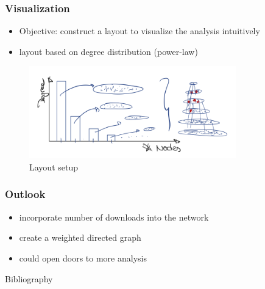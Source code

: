 \documentclass[fleqn]{beamer}
\begin{document}
    \begin{frame}
        \frametitle{Visualization}
        \begin{itemize}
            \item Objective: construct a layout to visualize the analysis
                intuitively
            \item layout based on degree distribution (power-law)
        \end{itemize}

        \begin{figure}[htpb]
            \centering
            \includegraphics[width=0.8\textwidth]{./pics/layout_setup.png}
            \caption{Layout setup}
        \end{figure}
    \end{frame}
    \begin{frame}
        \frametitle{Outlook}
        \begin{itemize}
            \item incorporate number of downloads into the network
            \item create a weighted directed graph
            \item could open doors to more analysis
        \end{itemize}
    \end{frame}

        \begin{frame}{Bibliography}
            \nocite{barabasi}
            \nocite{pypi}
            \printbibliography
        \end{frame}
\end{document}
